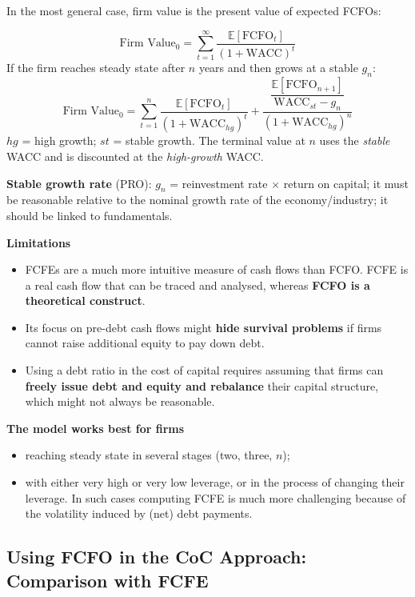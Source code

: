 In the most general case, firm value is the present value of expected FCFOs:
\begin{keybox}
\[
\text{Firm Value}_0=\sum_{t=1}^{\infty}\frac{\mathbb{E}[\text{FCFO}_t]}{(1+\text{WACC})^t}
\]
If the firm reaches steady state after $n$ years and then grows at a stable $g_n$:
\[
\text{Firm Value}_0=\sum_{t=1}^{n}\frac{\mathbb{E}[\text{FCFO}_t]}{(1+\text{WACC}_{hg})^t}+\frac{\dfrac{\mathbb{E}[\text{FCFO}_{n+1}]}{\text{WACC}_{st}-g_n}}{(1+\text{WACC}_{hg})^n}
\]
$hg$ = high growth; $st$ = stable growth. The terminal value at $n$ uses the \emph{stable} WACC and is discounted at the \emph{high-growth} WACC.
\end{keybox}

\textbf{Stable growth rate} (PRO): $g_n$ = reinvestment rate $\times$ return on capital; it must be reasonable relative to the nominal growth rate of the economy/industry; it should be linked to fundamentals.

\textbf{Limitations}
\begin{itemize}
  \item FCFEs are a much more intuitive measure of cash flows than FCFO. FCFE is a real cash flow that can be traced and analysed, whereas \textbf{FCFO is a theoretical construct}.
  \item Its focus on pre-debt cash flows might \textbf{hide survival problems} if firms cannot raise additional equity to pay down debt.
  \item Using a debt ratio in the cost of capital requires assuming that firms can \textbf{freely issue debt and equity and rebalance} their capital structure, which might not always be reasonable.
\end{itemize}
\textbf{The model works best for firms}
\begin{itemize}
  \item reaching steady state in several stages (two, three, $n$);
  \item with either very high or very low leverage, or in the process of changing their leverage. In such cases computing FCFE is much more challenging because of the volatility induced by (net) debt payments.
\end{itemize}

\subsection[Using FCFO in the CoC Approach: Comparison with FCFE]{Using FCFO in the CoC Approach: Comparison with FCFE }

